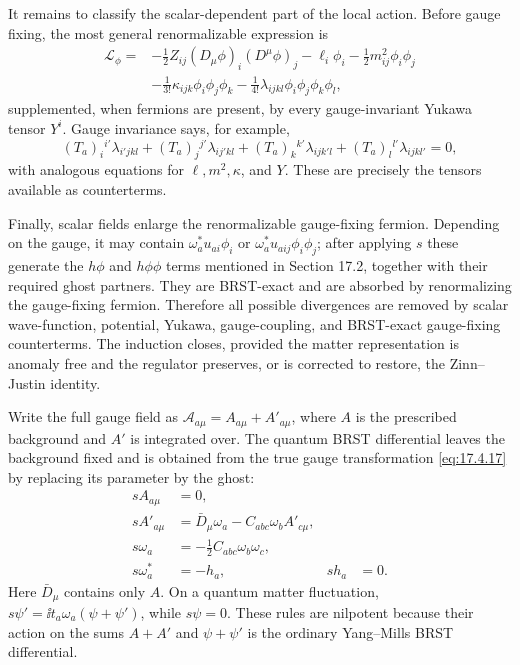 \begin{enumerate}
  It remains to classify the scalar-dependent part of the local action.
  Before gauge fixing, the most general renormalizable expression is
  \[
  \begin{split}
    \mathcal L_{\phi}={}&
      -\frac12 Z_{ij}(D_\mu\phi)_i(D^\mu\phi)_j
      -\ell_i\phi_i-\frac12m^2_{ij}\phi_i\phi_j\\
      &-\frac1{3!}\kappa_{ijk}\phi_i\phi_j\phi_k
      -\frac1{4!}\lambda_{ijkl}\phi_i\phi_j\phi_k\phi_l ,
  \end{split}
  \]
  supplemented, when fermions are present, by every gauge-invariant
  Yukawa tensor \(Y^i\).  Gauge invariance says, for example,
  \[
    (T_a)_i{}^{i'}\lambda_{i'jkl}
    +(T_a)_j{}^{j'}\lambda_{ij'kl}
    +(T_a)_k{}^{k'}\lambda_{ijk'l}
    +(T_a)_l{}^{l'}\lambda_{ijkl'}=0,
  \]
  with analogous equations for \(\ell,m^2,\kappa\), and \(Y\).  These are
  precisely the tensors available as counterterms.

  Finally, scalar fields enlarge the renormalizable gauge-fixing fermion.
  Depending on the gauge, it may contain
  \(\omega_a^*u_{a i}\phi_i\) or
  \(\omega_a^*u_{a ij}\phi_i\phi_j\); after applying \(s\) these
  generate the \(h\phi\) and \(h\phi\phi\) terms mentioned in
  Section 17.2, together with their required ghost partners.  They are
  BRST-exact and are absorbed by renormalizing the gauge-fixing fermion.
  Therefore all possible divergences are removed by scalar
  wave-function, potential, Yukawa, gauge-coupling, and BRST-exact
  gauge-fixing counterterms.  The induction closes, provided the matter
  representation is anomaly free and the regulator preserves, or is
  corrected to restore, the Zinn--Justin identity.

  Write the full gauge field as
  \(\mathcal A_{a\mu}=A_{a\mu}+A'_{a\mu}\), where \(A\)
  is the prescribed background and \(A'\) is integrated over.  The
  quantum BRST differential leaves the background fixed and is obtained
  from the true gauge transformation \eqref{eq:17.4.17} by replacing its
  parameter by the ghost:
  \[
  \begin{aligned}
    sA_{a\mu}&=0,\\
    sA'_{a\mu}
      &=\bar D_\mu\omega_a
        -C_{abc}\omega_b A'_{c\mu},\\
    s\omega_a
      &=-\frac12C_{abc}\omega_b\omega_c,\\
    s\omega_a^*&=-h_a,\qquad &sh_a&=0 .
  \end{aligned}
  \]
  Here \(\bar D_\mu\) contains only \(A\).  On a quantum matter
  fluctuation,
  \(s\psi'=\ii t_a\omega_a(\psi+\psi')\), while
  \(s\psi=0\).  These rules are nilpotent because their action on the
  sums \(A+A'\) and \(\psi+\psi'\) is the ordinary Yang--Mills BRST
  differential.


\end{enumerate}
